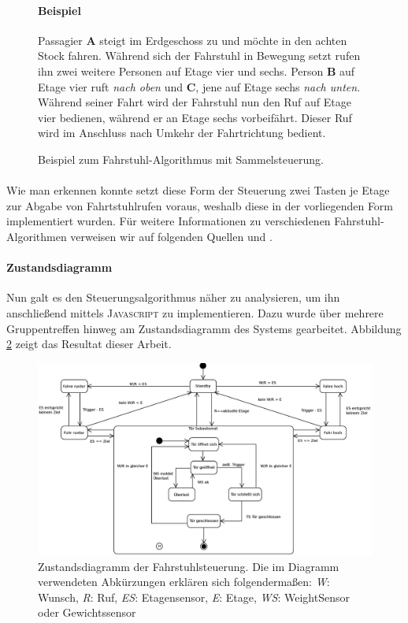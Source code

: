 \begin{figure}[h]
\begin{minipage}{0.47\textwidth}
		\paragraph{Beispiel}
		Passagier \textbf{A} steigt im Erdgeschoss zu und möchte in den achten Stock fahren. Während sich der Fahrstuhl in Bewegung setzt rufen ihn zwei weitere Personen auf Etage vier und sechs. Person \textbf{B} auf Etage vier ruft \textit{nach oben} und \textbf{C}, jene auf Etage sechs \textit{nach unten}.\\
		Während seiner Fahrt wird der Fahrstuhl nun den Ruf auf Etage vier bedienen, während er an Etage sechs vorbeifährt. Dieser Ruf wird im Anschluss nach Umkehr der Fahrtrichtung bedient.
	\end{minipage}
	\caption{Beispiel zum Fahrstuhl-Algorithmus mit Sammel\-steuerung.}
	\label{algo_exam}
\end{figure}

\paragraph{}Wie man erkennen konnte setzt diese Form der Steuerung zwei Tasten je Etage zur Abgabe von Fahrtstuhlrufen voraus, weshalb diese in der vorliegenden Form implementiert wurden. Für weitere Informationen zu verschiedenen Fahrstuhl-Algorithmen verweisen wir auf folgenden Quellen \cite{wiki_elev} und \cite{wiki_elev_2}.

\newpage
\paragraph{Zustandsdiagramm}Nun galt es den Steuerungsalgorithmus näher zu analysieren, um ihn anschließend mittels \textsc{Javascript} zu implementieren. Dazu wurde über mehrere Gruppentreffen hinweg am Zustandsdiagramm des Systems gearbeitet. Abbildung \ref{ZD} zeigt das Resultat dieser Arbeit.

\begin{figure}[h]
	\hspace*{-2.0cm}
	\includegraphics[width=1.3\textwidth]{images/ZDv6.eps}
	\caption{Zustandsdiagramm der Fahrstuhlsteuerung. Die im Diagramm verwendeten Abkürzungen erklären sich folgendermaßen: \textit{W}: Wunsch, \textit{R}: Ruf, \textit{ES}: Etagensensor, \textit{E}: Etage, \textit{WS}: WeightSensor oder Gewichtssensor}
	\label{ZD}
\end{figure}

